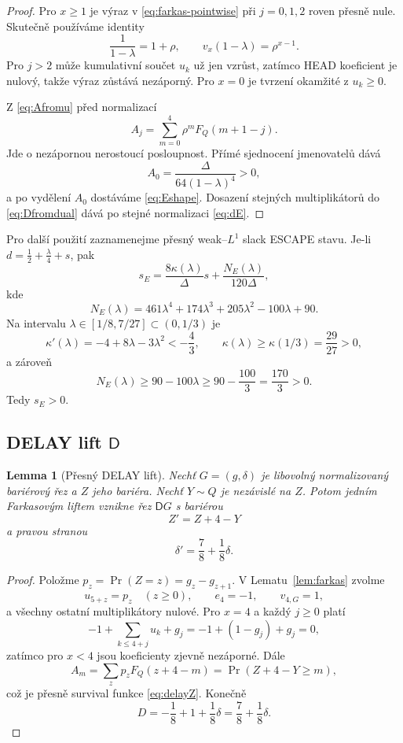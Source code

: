 \documentclass[11pt,a4paper]{article}
\newtheorem{lemma}[theorem]{Lemma}
\theoremstyle{remark}
\newcommand{\FQ}{F_Q}
\newcommand{\Dop}{\mathsf D}
\begin{document}
\begin{proof}
Pro $x\ge1$ je výraz v \eqref{eq:farkas-pointwise} při $j=0,1,2$
roven přesně nule. Skutečně používáme identity
\[
\frac1{1-\lambda}=1+\rho,
\qquad
v_x(1-\lambda)=\rho^{x-1}.
\]
Pro $j>2$ může kumulativní součet $u_k$ už jen vzrůst, zatímco HEAD
koeficient je nulový, takže výraz zůstává nezáporný. Pro $x=0$ je tvrzení
okamžité z $u_k\ge0$.

Z \eqref{eq:Afromu} před normalizací
\[
A_j=\sum_{m=0}^4\rho^m\FQ(m+1-j).
\]
Jde o nezápornou nerostoucí posloupnost. Přímé sjednocení jmenovatelů dává
\[
A_0=\frac{\Delta}{64(1-\lambda)^4}>0,
\]
a po vydělení $A_0$ dostáváme \eqref{eq:Eshape}. Dosazení stejných
multiplikátorů do \eqref{eq:Dfromdual} dává po stejné normalizaci
\eqref{eq:dE}.
\end{proof}

Pro další použití zaznamenejme přesný weak--$L^1$ slack ESCAPE stavu. Je-li
$d=\frac12+\frac\lambda4+s$, pak
\begin{equation}\label{eq:sE}
 s_E
 =\frac{8\kappa(\lambda)}{\Delta}s
 +\frac{N_E(\lambda)}{120\Delta},
\end{equation}
kde
\[
N_E(\lambda)=461\lambda^4+174\lambda^3+205\lambda^2-100\lambda+90.
\]
Na intervalu $\lambda\in[1/8,7/27]\subset(0,1/3)$ je
\[
\kappa'(\lambda)=-4+8\lambda-3\lambda^2< -\frac43,
\qquad
\kappa(\lambda)\ge\kappa(1/3)=\frac{29}{27}>0,
\]
a zároveň
\[
N_E(\lambda)\ge 90-100\lambda
\ge 90-\frac{100}{3}=\frac{170}{3}>0.
\]
Tedy $s_E>0$.

\subsection{DELAY lift $\Dop$}

\begin{lemma}[Přesný DELAY lift]\label{lem:D}
Nechť $G=(g,\delta)$ je libovolný normalizovaný bariérový řez a $Z$ jeho
bariéra. Nechť $Y\sim Q$ je nezávislé na $Z$. Potom jedním Farkasovým
liftem vznikne řez $\Dop G$ s bariérou
\begin{equation}\label{eq:delayZ}
\boxed{Z'=Z+4-Y}
\end{equation}
a pravou stranou
\begin{equation}\label{eq:delayd}
\boxed{\delta'=\frac78+\frac18\delta.}
\end{equation}
\end{lemma}

\begin{proof}
Položme $p_z=\Pr(Z=z)=g_z-g_{z+1}$. V Lematu~\ref{lem:farkas} zvolme
\[
u_{5+z}=p_z\quad(z\ge0),
\qquad e_4=-1,
\qquad v_{4,G}=1,
\]
a všechny ostatní multiplikátory nulové. Pro $x=4$ a každý $j\ge0$ platí
\[
-1+\sum_{k\le4+j}u_k+g_j
=-1+(1-g_j)+g_j=0,
\]
zatímco pro $x<4$ jsou koeficienty zjevně nezáporné. Dále
\[
A_m
=\sum_zp_z\FQ(z+4-m)
=\Pr(Z+4-Y\ge m),
\]
což je přesně survival funkce \eqref{eq:delayZ}. Konečně
\[
D=-\frac18+1+\frac18\delta
=\frac78+\frac18\delta.
\]
\end{proof}
\end{document}
